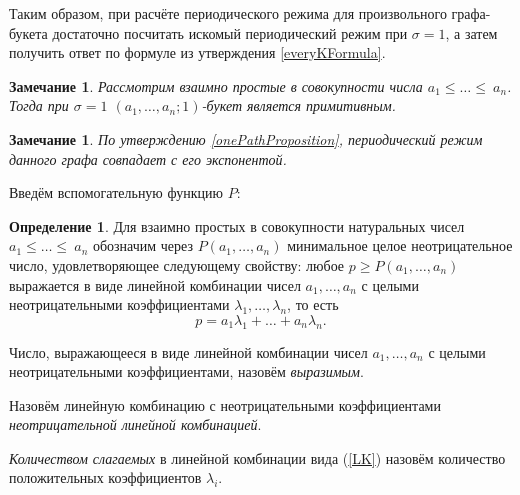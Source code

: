 \documentclass[12pt]{article}
\newtheorem{remark}[theorem]{Замечание}
\theoremstyle{definition}
\newtheorem{definition}[theorem]{Определение}
\begin{document}
Таким образом, при расчёте периодического режима для произвольного графа-букета достаточно посчитать искомый периодический режим при $\sigma = 1$, а затем получить ответ по формуле из утверждения \ref{everyKFormula}. 

\begin{remark}
Рассмотрим взаимно простые в совокупности числа $a_1 \le \dots \le ~a_n$. Тогда при $\sigma = 1$ $(a_1, \dots, a_n; 1)$-букет является примитивным.
\end{remark}

\begin{remark}
\label{rmrk:expAndT}
По утверждению \ref{onePathProposition}, периодический режим данного графа совпадает с его экспонентой.
\end{remark}

Введём вспомогательную функцию $P$:

\begin{definition}
Для взаимно простых в совокупности натуральных чисел $a_1 \le \dots \le~a_n$ обозначим через $P(a_1, \dots, a_n)$ минимальное целое неотрицательное число, удовлетворяющее следующему свойству: любое $p \ge P(a_1, \dots, a_n)$ выражается в виде линейной комбинации чисел $a_1, \dots, a_n$ с целыми неотрицательными коэффициентами $\lambda_1, \dots, \lambda_n$, то есть
\begin{equation}
\label{LK}
p = a_1 \lambda_1 + \dots + a_n \lambda_n.
\end{equation}

Число, выражающееся в виде линейной комбинации чисел $a_1, \dots, a_n$ с целыми неотрицательными коэффициентами, назовём \textit{выразимым}.

Назовём линейную комбинацию с неотрицательными коэффициентами \textit{неотрицательной линейной комбинацией}.

\textit{Количеством слагаемых} в линейной комбинации вида (\ref{LK}) назовём количество положительных коэффициентов $\lambda_i$.
\end{definition}
\end{document}
